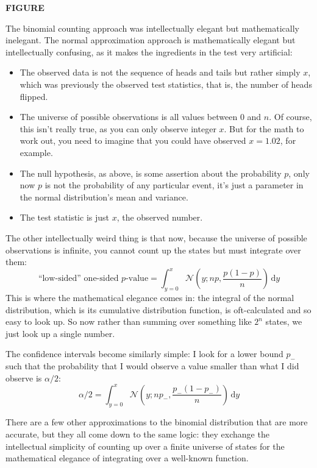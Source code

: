 \textbf{FIGURE}

The binomial counting approach was intellectually elegant but mathematically
inelegant. The normal approximation approach is mathematically elegant but
intellectually confusing, as it makes the ingredients in the test very
artificial:
\begin{itemize}
    \item The observed data is not the sequence of heads and tails but rather simply $x$, which was previously the observed test statistics, that is, the number of heads flipped.
    \item The universe of possible observations is all values between $0$ and $n$. Of course, this isn't really true, as you can only observe integer $x$. But for the math to work out, you need to imagine that you could have observed $x = 1.02$, for example.
    \item The null hypothesis, as above, is some assertion about the probability $p$, only now $p$ is not the probability of any particular event, it's just a parameter in the normal distribution's mean and variance.
    \item The test statistic is just $x$, the observed number.
\end{itemize}

The other intellectually weird thing is that now, because the universe of possible observations is infinite, you cannot count up the states but must integrate over them:
\begin{equation}
    \text{``low-sided'' one-sided $p$-value} = \int_{y=0}^x \mathcal{N}\left(y; np, \frac{p(1-p)}{n} \right) \,\mathrm{d}y
\end{equation}
This is where the mathematical elegance comes in: the integral of the normal distribution, which is its cumulative distribution function, is oft-calculated and so easy to look up. So now rather than summing over something like $2^n$ states, we just look up a single number.

The confidence intervals become similarly simple: I look for a lower bound $p_-$ such that the probability that I would observe a value smaller than what I did observe is $\alpha/2$:
\begin{equation}
    \alpha/2 = \int_{y=0}^x \mathcal{N} \left(y; np_-, \frac{p_-(1-p_-)}{n} \right) \,\mathrm{d}y
\end{equation}

There are a few other approximations to the binomial distribution that are more
accurate, but they all come down to the same logic: they exchange the
intellectual simplicity of counting up over a finite universe of states for the
mathematical elegance of integrating over a well-known function.


